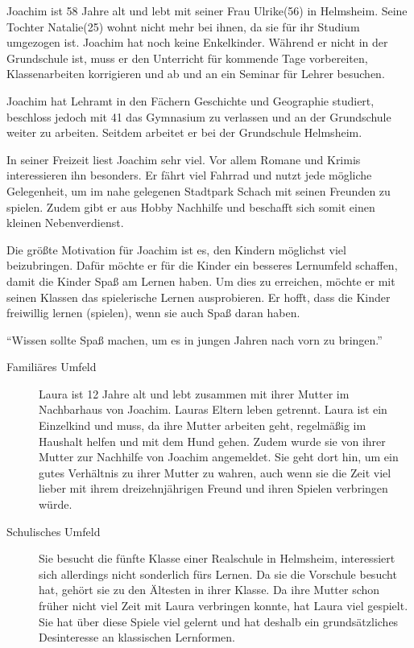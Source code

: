 \begin{description}
\begin{description}
			\item[Familiäres Umfeld]{Joachim ist 58 Jahre alt und lebt mit seiner Frau Ulrike(56) in Helmsheim. Seine Tochter Natalie(25) wohnt nicht mehr bei ihnen, da sie für ihr Studium umgezogen ist. Joachim hat noch keine Enkelkinder. Während er nicht in der Grundschule ist, muss er den Unterricht für kommende Tage vorbereiten, Klassenarbeiten korrigieren und ab und an ein Seminar für Lehrer besuchen.}
			\item[Schulisches Umfeld]{Joachim hat Lehramt in den Fächern Geschichte und Geographie studiert, beschloss jedoch mit 41 das Gymnasium zu verlassen und an der Grundschule weiter zu arbeiten. Seitdem arbeitet er bei der Grundschule Helmsheim.}
			\item[Interessen und Hobbys]{In seiner Freizeit liest Joachim sehr viel. Vor allem Romane und Krimis interessieren ihn besonders. Er fährt viel Fahrrad und nutzt jede mögliche Gelegenheit, um im nahe gelegenen Stadtpark Schach mit seinen Freunden zu spielen. Zudem gibt er aus Hobby Nachhilfe und beschafft sich somit einen kleinen Nebenverdienst.}
			\item[Motivation]{Die größte Motivation für Joachim ist es, den Kindern möglichst viel beizubringen. Dafür möchte er für die Kinder ein besseres Lernumfeld schaffen, damit die Kinder Spaß am Lernen haben. Um dies zu erreichen, möchte er mit seinen Klassen das spielerische Lernen ausprobieren. Er hofft, dass die Kinder freiwillig lernen (spielen), wenn sie auch Spaß daran haben.}
			\item{\enquote{Wissen sollte Spaß machen, um es in jungen Jahren nach vorn zu bringen.}}
		\end{description}
		\item[Laura Dietz: Die Rennfahrerin]<TODO: Bild>\hfill
		\begin{description}
			\item[Familiäres Umfeld]{Laura ist 12 Jahre alt und lebt zusammen mit ihrer Mutter im Nachbarhaus von Joachim. Lauras Eltern leben getrennt. Laura ist ein Einzelkind und muss, da ihre Mutter arbeiten geht, regelmäßig im Haushalt helfen und mit dem Hund gehen. Zudem wurde sie von ihrer Mutter zur Nachhilfe von Joachim angemeldet. Sie geht dort hin, um ein gutes Verhältnis zu ihrer Mutter zu wahren, auch wenn sie die Zeit viel lieber mit ihrem dreizehnjährigen Freund und ihren Spielen verbringen würde.}
			\item[Schulisches Umfeld]{Sie besucht die fünfte Klasse einer Realschule in Helmsheim, interessiert sich allerdings nicht sonderlich fürs Lernen. Da sie die Vorschule besucht hat, gehört sie zu den Ältesten in ihrer Klasse. Da ihre Mutter schon früher nicht viel Zeit mit Laura verbringen konnte, hat Laura viel gespielt. Sie hat über diese Spiele viel gelernt und hat deshalb ein grundsätzliches Desinteresse an klassischen Lernformen.}

\end{description}
\end{description}
